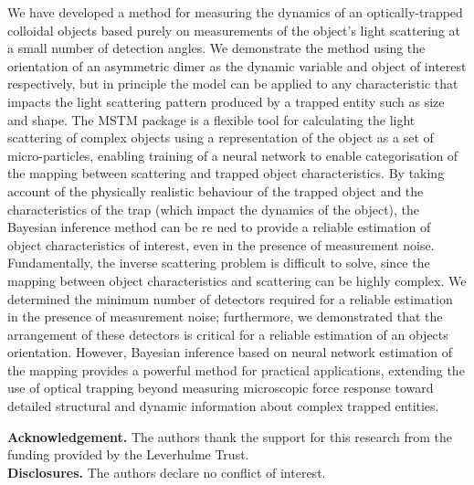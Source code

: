 \documentclass[preprint,  3p]{elsarticle}
\begin{document}
We have developed a method for measuring the dynamics of an optically-trapped colloidal objects based purely on measurements of the object's light scattering at a small number of detection angles. We demonstrate the method using the orientation of an asymmetric dimer as the dynamic variable and object of interest respectively, but in principle the model can be applied to any characteristic that impacts the light scattering pattern produced by a trapped entity such as size and shape. The MSTM package is a flexible tool for calculating the light scattering of complex objects using a representation of the object as a set of micro-particles, enabling training of a neural network to enable categorisation of the mapping between scattering and trapped object characteristics. By taking account of the physically realistic behaviour of the trapped object and the characteristics of the trap (which impact the dynamics of the object), the Bayesian inference method can be re ned to provide a reliable estimation of object characteristics of interest, even in the presence of measurement noise. Fundamentally, the inverse scattering problem is difficult to solve, since the mapping between object characteristics and scattering can be highly complex. We determined the minimum number of detectors required for a reliable estimation in the presence of measurement noise; furthermore, we demonstrated that the arrangement of these detectors is critical for a reliable estimation of an objects orientation. However, Bayesian inference based on neural network estimation of the mapping provides a powerful method for practical applications, extending the use of optical trapping beyond measuring microscopic force response toward detailed structural and dynamic information about complex trapped entities. 



\noindent \textbf{Acknowledgement.} The authors thank the support for this research from the funding provided by the Leverhulme Trust. \\
  
\noindent \textbf{Disclosures.} The authors declare no conflict of interest. \\


 

\end{document}

